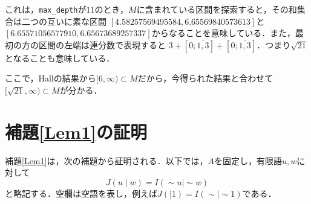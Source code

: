 \documentclass[10pt,a4paper]{ujarticle}
\theoremstyle{definition}
\begin{document}
これは，\verb|max_depth|が$11$のとき，$M$に含まれている区間を探索すると，その和集合は二つの互いに素な区間
$[4.58257569495584, 6.65569840573613]$と$[6.65571056577910, 6.65673689257337]$からなることを意味している．また，最初の方の区間の左端は連分数で表現すると
$3 + [0; \overline{1,3}] +  [0; \overline{1,3}]$．つまり$\sqrt{21}$となることも意味している．

ここで，Hallの結果\cite{hall}から$[6,\infty) \subset M$だから，今得られた結果と合わせて$[\sqrt{21},\infty) \subset M$が分かる．
  


\section{補題\ref{Lem1}の証明}
補題\ref{Lem1}は，次の補題から証明される．以下では，$A$を固定し，有限語$u,w$に対して
\[
  J(u\mid w)=I(\sim u\mid\sim w)
\]
と略記する．空欄は空語を表し，例えば$J(\mid 1)=I(\sim\mid\sim 1)$である．
\end{document}
